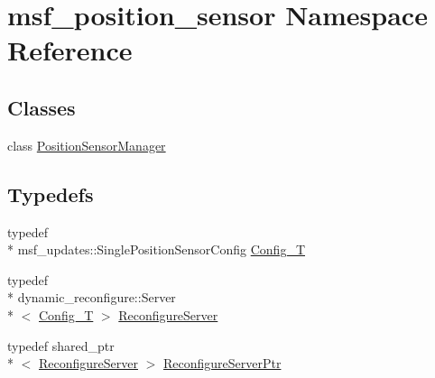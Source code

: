 \hypertarget{namespacemsf__position__sensor}{\section{msf\-\_\-position\-\_\-sensor Namespace Reference}
\label{namespacemsf__position__sensor}
}
\subsection*{Classes}
\begin{DoxyCompactItemize}
\item 
class \hyperlink{classmsf__position__sensor_1_1PositionSensorManager}{Position\-Sensor\-Manager}
\end{DoxyCompactItemize}
\subsection*{Typedefs}
\begin{DoxyCompactItemize}
\item 
typedef \\*
msf\-\_\-updates\-::\-Single\-Position\-Sensor\-Config \hyperlink{namespacemsf__position__sensor_a888f7a67abc78bbe9b927b35f1e05933}{Config\-\_\-\-T}
\item 
typedef \\*
dynamic\-\_\-reconfigure\-::\-Server\\*
$<$ \hyperlink{namespacemsf__position__sensor_a888f7a67abc78bbe9b927b35f1e05933}{Config\-\_\-\-T} $>$ \hyperlink{namespacemsf__position__sensor_a481ab70c52d45ad3c2cef969e1d959ca}{Reconfigure\-Server}
\item 
typedef shared\-\_\-ptr\\*
$<$ \hyperlink{namespacemsf__position__sensor_a481ab70c52d45ad3c2cef969e1d959ca}{Reconfigure\-Server} $>$ \hyperlink{namespacemsf__position__sensor_a62920eb4890a10e8224aa5ef62bb56a2}{Reconfigure\-Server\-Ptr}
\end{DoxyCompactItemize}


